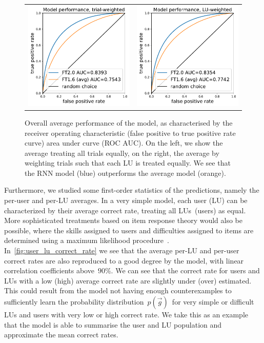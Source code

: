 \begin{figure}[ht]
\centering
\begin{tabular}{cc}
\includegraphics[width=0.4\linewidth]{figures/lingvist/roc_trial.pdf} &
\includegraphics[width=0.4\linewidth]{figures/lingvist/roc_lu.pdf} \\
\end{tabular}
\caption[Overall knowledge estimation model performance]{Overall average performance of the model, as characterised by the receiver operating characteristic (false positive to true positive rate curve) area under curve (ROC AUC). On the left, we show the average treating all trials equally, on the right, the average by weighting trials such that each LU is treated equally. We see that the RNN model (blue) outperforms the average model (orange).} 
\label{fig:roc} 
\end{figure} 

Furthermore, we studied some first-order statistics of the predictions, namely the per-user and per-LU averages. In a very simple model, each user (LU) can be characterized by their average correct rate, treating all LUs (users) as equal. More sophisticated treatments based on item response theory would also be possible, where the skills assigned to users and difficulties assigned to items are determined using a maximum likelihood procedure~\cite{embretson2013item}. In~\cref{fig:user_lu_correct_rate} we see that the average per-LU and per-user correct rates are also reproduced to a good degree by the model, with linear correlation coefficients above~$90\%$. We can see that the correct rate for users and LUs with a low (high) average correct rate are slightly under (over) estimated. This could result from the model not having enough counterexamples to sufficiently learn the probability distribution~$p(\vec{g})$~for very simple or difficult LUs and users with very low or high correct rate. We take this as an example that the model is able to summarise the user and LU population and approximate the mean correct rates.


